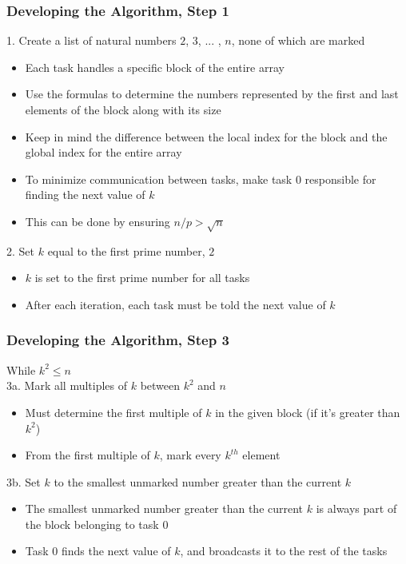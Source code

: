 \documentclass[13pt]{beamer}
\begin{document}
\begin{frame}
\frametitle{Developing the Algorithm, Step 1}
\alert{1. Create a list of natural numbers $2$, $3$, ... , $n$, none of which are marked}
\begin{itemize}
  \item Each task handles a specific block of the entire array
  \item Use the formulas to determine the numbers represented by the first and last elements of the block along with its size
  \item Keep in mind the difference between the local index for the block and the global index for the entire array
  \item To minimize communication between tasks, make task 0 responsible for finding the next value of $k$
  \item This can be done by ensuring $n/p > \sqrt{n}$
\end{itemize}
\end{frame}

\begin{frame}
  \alert{2. Set $k$ equal to the first prime number, $2$}
  \begin{itemize}
    \item $k$ is set to the first prime number for all tasks
    \item After each iteration, each task must be told the next value of $k$

  \end{itemize}
\end{frame}

\begin{frame}
\frametitle{Developing the Algorithm, Step 3}
\alert{While $k^2 \leq n$\\}
\alert{3a. Mark all multiples of $k$ between $k^2$ and $n$}
\begin{itemize}
  \item Must determine the first multiple of $k$ in the given block (if it's greater than $k^2$)
  \item From the first multiple of $k$, mark every $k^{th}$ element
\end{itemize}

\alert{3b. Set $k$ to the smallest unmarked number greater than the current $k$}
\begin{itemize}
  \item The smallest unmarked number greater than the current $k$ is always part of the block belonging to task 0
  \item Task 0 finds the next value of $k$, and broadcasts it to the rest of the tasks
\end{itemize}
\end{frame}
\end{document}
